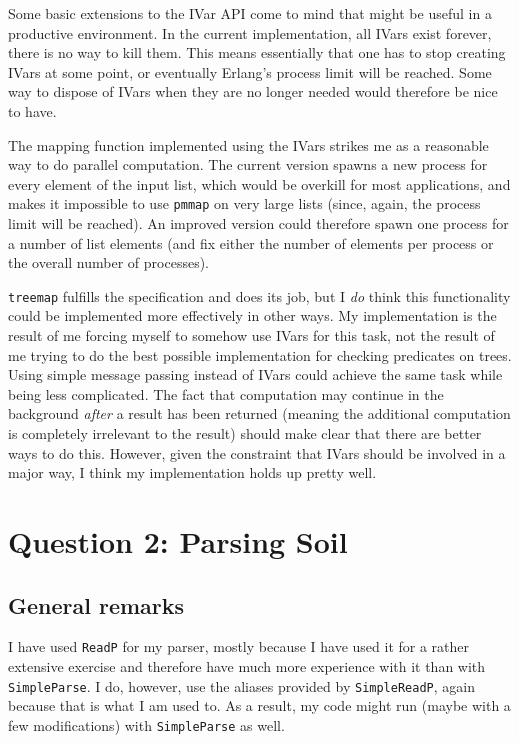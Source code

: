 \documentclass[a4paper]{article}
\begin{document}
Some basic extensions to the IVar API come to mind that might be useful in a productive environment. In the current implementation, all IVars exist forever, there is no way to kill them. This means essentially that one has to stop creating IVars at some point, or eventually Erlang's process limit will be reached. Some way to dispose of IVars when they are no longer needed would therefore be nice to have.

The mapping function implemented using the IVars strikes me as a reasonable way to do parallel computation. The current version spawns a new process for every element of the input list, which would be overkill for most applications, and makes it impossible to use \texttt{pmmap} on very large lists (since, again, the process limit will be reached). An improved version could therefore spawn one process for a number of list elements (and fix either the number of elements per process or the overall number of processes).

\texttt{treemap} fulfills the specification and does its job, but I \emph{do} think this functionality could be implemented more effectively in other ways. My implementation is the result of me forcing myself to somehow use IVars for this task, not the result of me trying to do the best possible implementation for checking predicates on trees. Using simple message passing instead of IVars could achieve the same task while being less complicated. The fact that computation may continue in the background \emph{after} a result has been returned (meaning the additional computation is completely irrelevant  to the result) should make clear that there are better ways to do this. However, given the constraint that IVars should be involved in a major way, I think my implementation holds up pretty well.

\section*{Question 2: Parsing Soil}

\subsection*{General remarks}
I have used \texttt{ReadP} for my parser, mostly because I have used it for a rather extensive exercise and therefore have much more experience with it than with \texttt{SimpleParse}. I do, however, use the aliases provided by \texttt{SimpleReadP}, again because that is what I am used to. As a result, my code might run (maybe with a few modifications) with \texttt{SimpleParse} as well.
\end{document}
